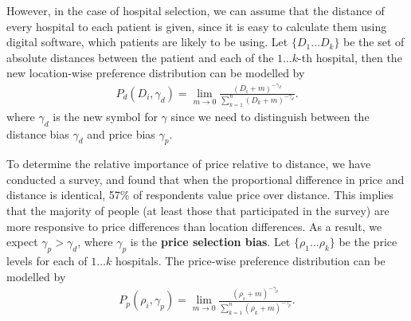 \documentclass{article}
\begin{document}
However, in the case of hospital selection, we can assume that the distance of every hospital to each patient is given, since it is easy to calculate them using digital software, which patients are likely to be using. Let $\{D_1\dots D_k\}$ be the set of absolute distances between the patient and each of the $1\dots k$-th hospital, then the new location-wise preference distribution can be modelled by
\begin{gather}
     P_d\left(D_i, \gamma_d\right) = \lim_{m \to 0} \frac{(D_i + m)^{-\gamma_d}}{\displaystyle\sum_{k=1}^n (D_k + m)^{-\gamma_d}}.
\end{gather}
where $\gamma_d$ is the new symbol for $\gamma$ since we need to distinguish between the distance bias $\gamma_d$ and price bias $\gamma_p$.

To determine the relative importance of price relative to distance, we have conducted a survey, and found that when the proportional difference in price and distance is identical, 57\% of respondents value price over distance. This implies that the majority of people (at least those that participated in the survey) are more responsive to price differences than location differences. As a result, we expect $\gamma_p > \gamma_d$, where $\gamma_p$ is the \textbf{price selection bias}. Let $\{\rho_1\dots\rho_k\}$ be the price levels for each of $1\dots k$ hospitals. The price-wise preference distribution can be modelled by
\begin{gather}
    P_p\left(\rho_i, \gamma_p\right) = \lim_{m \to 0} \frac{(\rho_i + m)^{-\gamma_p}}{\displaystyle\sum_{k=1}^n (\rho_k + m)^{-\gamma_p}}.
\end{gather}
\end{document}
